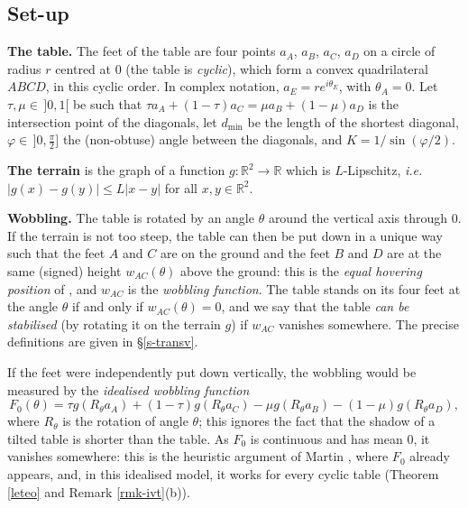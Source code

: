 \documentclass[a4paper,11pt,twoside,leqno]{article}
\newcommand{\ie}[0]{\emph{i.e.} }
\newcommand{\rr}[0]{\ensuremath{\mathbb{R}}}
\numberwithin{equation}{section}
\begin{document}
\subsection{Set-up}\label{ss-intro-setup}

\textbf{The table.} The feet of the table are four points $a_A$, $a_B$, $a_C$, $a_D$ on a circle of radius $r$ centred at $0$ (the table is \emph{cyclic}), which form a convex quadrilateral $ABCD$, in this cyclic order. In complex notation, $a_E = r e^{i\theta_E}$, with $\theta_A = 0$. Let $\tau, \mu \in \,]0,1[$ be such that $\tau a_A + (1-\tau) a_C = \mu a_B + (1-\mu) a_D$ is the intersection point of the diagonals, let $d_{\min}$ be the length of the shortest diagonal, $\varphi \in \,]0, \frac{\pi}{2}]$ the (non-obtuse) angle between the diagonals, and $K = 1/\sin(\varphi/2)$.

\textbf{The terrain} is the graph of a function $g : \rr^2 \to \rr$ which is $L$-Lipschitz, \ie $|g(x) - g(y)| \leq L|x-y|$ for all $x, y \in \rr^2$.

\textbf{Wobbling.} The table is rotated by an angle $\theta$ around the vertical axis through $0$. If the terrain is not too steep, the table can then be put down in a unique way such that the feet $A$ and $C$ are on the ground and the feet $B$ and $D$ are at the same (signed) height $w_{AC}(\theta)$ above the ground: this is the \emph{equal hovering position} of \cite{BLPR}, and $w_{AC}$ is the \emph{wobbling function}. The table stands on its four feet at the angle $\theta$ if and only if $w_{AC}(\theta) = 0$, and we say that the table \emph{can be stabilised} (by rotating it on the terrain $g$) if $w_{AC}$ vanishes somewhere. The precise definitions are given in \S{}\ref{s-transv}.

If the feet were independently put down vertically, the wobbling would be measured by the \emph{idealised wobbling function}
\[
F_0(\theta) = \tau g(R_\theta a_A) + (1-\tau) g(R_\theta a_C) - \mu g(R_\theta a_B) - (1-\mu) g(R_\theta a_D),
\]
where $R_\theta$ is the rotation of angle $\theta$; this ignores the fact that the shadow of a tilted table is shorter than the table. As $F_0$ is continuous and has mean $0$, it vanishes somewhere: this is the heuristic argument of Martin \cite[\S{}4]{Mar}, where $F_0$ already appears, and, in this idealised model, it works for every cyclic table (Theorem \ref{leteo} and Remark \ref{rmk-ivt}(b)).
\end{document}
